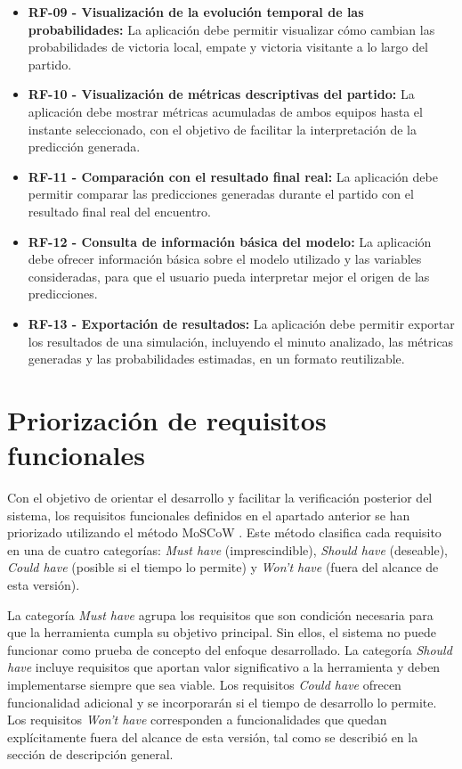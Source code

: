 \begin{itemize}
    \item \textbf{RF-09 - Visualización de la evolución temporal de las probabilidades:} La aplicación debe permitir visualizar cómo cambian las probabilidades de victoria local, empate y victoria visitante a lo largo del partido.

    \item \textbf{RF-10 - Visualización de métricas descriptivas del partido:} La aplicación debe mostrar métricas acumuladas de ambos equipos hasta el instante seleccionado, con el objetivo de facilitar la interpretación de la predicción generada.

    \item \textbf{RF-11 - Comparación con el resultado final real:} La aplicación debe permitir comparar las predicciones generadas durante el partido con el resultado final real del encuentro.

    \item \textbf{RF-12 - Consulta de información básica del modelo:} La aplicación debe ofrecer información básica sobre el modelo utilizado y las variables consideradas, para que el usuario pueda interpretar mejor el origen de las predicciones.

    \item \textbf{RF-13 - Exportación de resultados:} La aplicación debe permitir exportar los resultados de una simulación, incluyendo el minuto analizado, las métricas generadas y las probabilidades estimadas, en un formato reutilizable.
\end{itemize}

\section{Priorización de requisitos funcionales}

Con el objetivo de orientar el desarrollo y facilitar la verificación posterior del sistema, los requisitos funcionales definidos en el apartado anterior se han priorizado utilizando el método MoSCoW \citep{clegg1994case}. Este método clasifica cada requisito en una de cuatro categorías: \textit{Must have} (imprescindible), \textit{Should have} (deseable), \textit{Could have} (posible si el tiempo lo permite) y \textit{Won't have} (fuera del alcance de esta versión).

La categoría \textit{Must have} agrupa los requisitos que son condición necesaria para que la herramienta cumpla su objetivo principal. Sin ellos, el sistema no puede funcionar como prueba de concepto del enfoque desarrollado. La categoría \textit{Should have} incluye requisitos que aportan valor significativo a la herramienta y deben implementarse siempre que sea viable. Los requisitos \textit{Could have} ofrecen funcionalidad adicional y se incorporarán si el tiempo de desarrollo lo permite. Los requisitos \textit{Won't have} corresponden a funcionalidades que quedan explícitamente fuera del alcance de esta versión, tal como se describió en la sección de descripción general.

